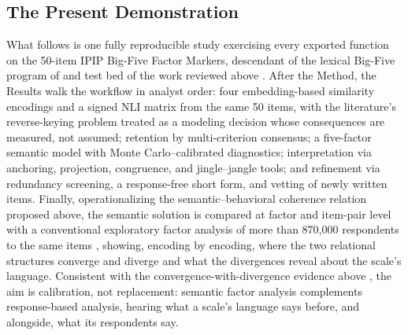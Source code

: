 \subsection{The Present Demonstration}

What follows is one fully reproducible study exercising every exported function on the 50-item IPIP Big-Five Factor Markers, descendant of the lexical Big-Five program of \citet{goldberg-1990} and test bed of the work reviewed above \citep{casella-etal-2024,milano-etal-2025a,jung-seo-2025}. After the Method, the Results walk the workflow in analyst order: four embedding-based similarity encodings and a signed NLI matrix from the same 50 items, with the literature's reverse-keying problem treated as a modeling decision whose consequences are measured, not assumed; retention by multi-criterion consensus; a five-factor semantic model with Monte Carlo--calibrated diagnostics; interpretation via anchoring, projection, congruence, and jingle--jangle tools; and refinement via redundancy screening, a response-free short form, and vetting of newly written items. Finally, operationalizing the semantic--behavioral coherence relation proposed above, the semantic solution is compared at factor and item-pair level with a conventional exploratory factor analysis of more than 870{,}000 respondents to the same items \citep{openpsychometrics-2018}, showing, encoding by encoding, where the two relational structures converge and diverge and what the divergences reveal about the scale's language. Consistent with the convergence-with-divergence evidence above \citep{kojima-etal-2026,feraco-toffalini-2025}, the aim is calibration, not replacement: semantic factor analysis complements response-based analysis, hearing what a scale's language says before, and alongside, what its respondents say.
